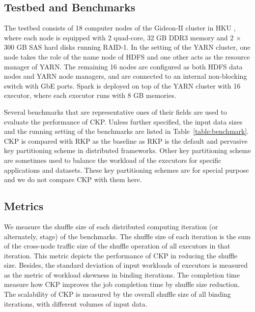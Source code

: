 \documentclass[10pt,journal,compsoc]{IEEEtran}
\begin{document}
\subsection{Testbed and Benchmarks}
The testbed consists of 18 computer nodes of the Gideon-II cluster in HKU \cite{gideon}, where each node is equipped with 2 quad-core, 32 GB DDR3 memory and 2 $\times$ 300 GB SAS hard disks running RAID-1. 
In the setting of the YARN cluster, one node takes the role of  the name node of HDFS and one other acts as the resource manager of YARN. The remaining 16 nodes are configured as both HDFS data nodes and YARN node managers, and are connected to an internal non-blocking switch with GbE ports.
Spark is deployed on top of the YARN cluster with 16 executor, where each executor runs with 8 GB memories. 

Several benchmarks that are representative ones of their fields are used to evaluate the performance of CKP.
Unless further specified, the input data sizes and the running setting of the benchmarks are listed in Table~\ref{table:benchmark}.
CKP is compared with RKP as the baseline as RKP is the default and pervasive key partitioning scheme in distributed frameworks. 
Other key partitioning scheme are sometimes used to balance the workload of the executors for specific applications and datasets. 
These key partitioning schemes are for special purpose and we do not compare CKP with them here. 

\subsection{Metrics}
We measure the shuffle size of each distributed computing iteration (or alternately, stage) of the benchmarks. 
The shuffle size of each iteration is the sum of the cross-node traffic size of the shuffle operation of all executors in that iteration. 
This metric depicts the performance of CKP in reducing the shuffle size. 
Besides, the standard deviation of input workloads of executors is measured as the metric of workload skewness in binding iterations. 
The completion time measure how CKP improves the job completion time by shuffle 
size reduction.
The scalability of CKP is measured by the overall shuffle size of all binding iterations, with different volumes of input data. 
\end{document}
